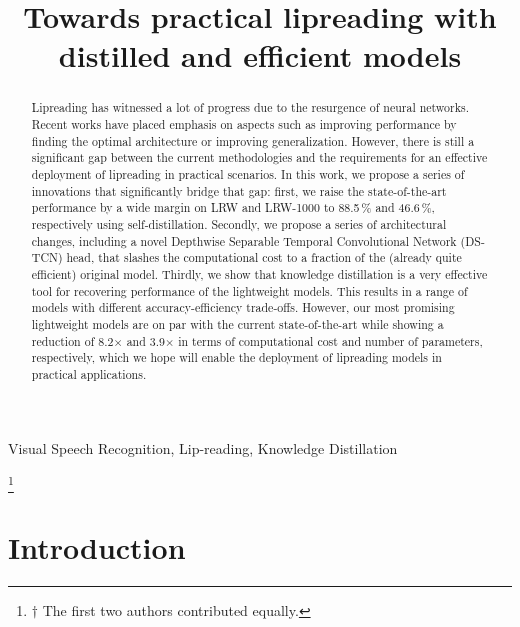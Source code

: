 \documentclass{article}
\title{Towards practical lipreading with distilled and efficient models}
\begin{document}
\maketitle

\begin{abstract}
Lipreading has witnessed a lot of progress due to the resurgence of neural networks. Recent works have placed emphasis on aspects such as improving performance by finding the optimal architecture or improving generalization. However, there is still a significant gap between the current methodologies and the requirements for an effective deployment of lipreading in practical scenarios. In this work, we propose a series of innovations that significantly bridge that gap: first, we raise the state-of-the-art performance by a wide margin on LRW and LRW-1000 to 88.5\,\% and 46.6\,\%, respectively using self-distillation. Secondly, we propose a series of architectural changes, including a novel Depthwise  Separable Temporal Convolutional Network (DS-TCN) head, that slashes the computational cost to a fraction of the (already quite efficient) original model. Thirdly, we show that knowledge distillation is a very effective tool for recovering performance of the lightweight models. This results in a range of models with different accuracy-efficiency trade-offs. However, our most promising lightweight models are on par with the current state-of-the-art while showing a reduction of 8.2$\times$ and 3.9$\times$ in terms of computational cost and number of parameters, respectively, which we hope will enable the deployment of lipreading models in practical applications.
\end{abstract}
\begin{keywords}
Visual Speech Recognition, Lip-reading, Knowledge Distillation
\end{keywords}


\let\thefootnote\relax\footnote{$\dagger$ The first two authors contributed equally.}


\section{Introduction}
\label{sec:intro}
\end{document}
